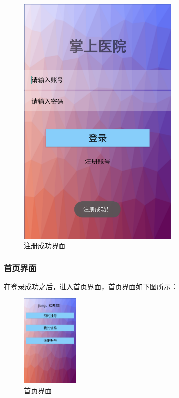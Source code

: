 \documentclass[UTF8,12pt]{article}
\begin{document}
\begin{figure}[htbp]
\begin{minipage}[t]{0.45\textwidth}
        \includegraphics[width=0.7\textwidth]{imgs/31.png}
        \caption{注册成功界面}
    \end{minipage}
\end{figure}

\subsubsection{首页界面}

在登录成功之后，进入首页界面，首页界面如下图所示：

\begin{figure}[htbp]
    \centering
    \includegraphics[width=0.25\textwidth]{imgs/13.png}
    \caption{首页界面}
\end{figure}
\end{document}
